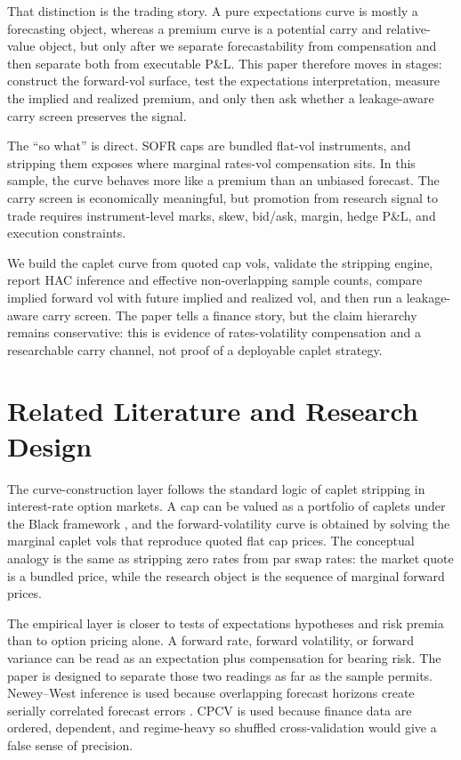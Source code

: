 \documentclass[12pt]{article}
\begin{document}
That distinction is the trading story. A pure expectations curve is mostly a forecasting object, whereas a premium curve is a potential carry and relative-value object, but only after we separate forecastability from compensation and then separate both from executable P\&L. This paper therefore moves in stages: construct the forward-vol surface, test the expectations interpretation, measure the implied and realized premium, and only then ask whether a leakage-aware carry screen preserves the signal.

The ``so what'' is direct. SOFR caps are bundled flat-vol instruments, and stripping them exposes where marginal rates-vol compensation sits. In this sample, the curve behaves more like a premium than an unbiased forecast. The carry screen is economically meaningful, but promotion from research signal to trade requires instrument-level marks, skew, bid/ask, margin, hedge P\&L, and execution constraints.

We build the caplet curve from quoted cap vols, validate the stripping engine, report HAC inference and effective non-overlapping sample counts, compare implied forward vol with future implied and realized vol, and then run a leakage-aware carry screen. The paper tells a finance story, but the claim hierarchy remains conservative: this is evidence of rates-volatility compensation and a researchable carry channel, not proof of a deployable caplet strategy.

\section{Related Literature and Research Design}

The curve-construction layer follows the standard logic of caplet stripping in interest-rate option markets. A cap can be valued as a portfolio of caplets under the Black framework \cite{black1976}, and the forward-volatility curve is obtained by solving the marginal caplet vols that reproduce quoted flat cap prices. The conceptual analogy is the same as stripping zero rates from par swap rates: the market quote is a bundled price, while the research object is the sequence of marginal forward prices.

The empirical layer is closer to tests of expectations hypotheses and risk premia than to option pricing alone. A forward rate, forward volatility, or forward variance can be read as an expectation plus compensation for bearing risk. The paper is designed to separate those two readings as far as the sample permits. Newey--West inference is used because overlapping forecast horizons create serially correlated forecast errors \cite{neweywest1987}. CPCV is used because finance data are ordered, dependent, and regime-heavy so shuffled cross-validation would give a false sense of precision.
\end{document}
